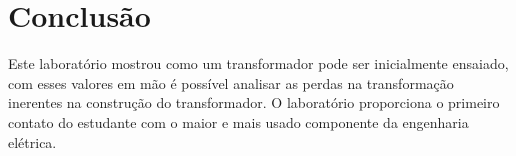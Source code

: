\documentclass[conference]{IEEEtran}
\begin{document}
%





\section{Conclusão}

Este laboratório mostrou como um transformador pode ser inicialmente ensaiado, 
com esses valores em mão é possível analisar as perdas na transformação inerentes
na construção do transformador. O laboratório proporciona o primeiro contato
do estudante com o maior e mais usado componente da engenharia elétrica.





\end{document}
